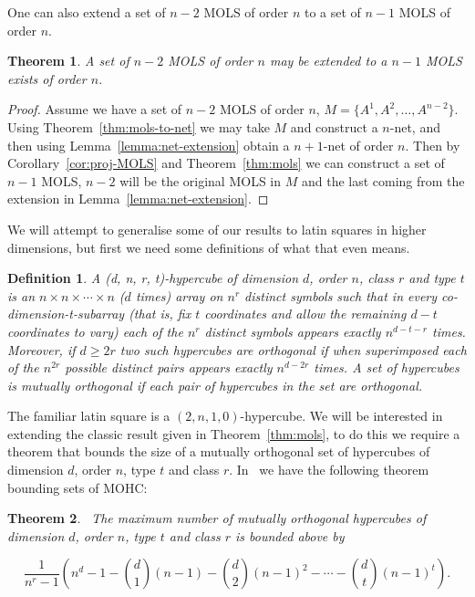 \documentclass{article}
\newtheorem{theorem}{Theorem}
\newtheorem{definition}{Definition}
\begin{document}
      One can also extend a set of \(n - 2\) MOLS of order \(n\) to a set of \(n - 1\) MOLS of order \(n\).

      \begin{theorem}
        A set of \(n - 2\) MOLS of order \(n\) may be extended to a \(n - 1\) MOLS exists of order \(n\).
      \end{theorem}

      \begin{proof}
        Assume we have a set of \(n - 2\) MOLS of order \(n\), \(M = \{A^{1}, A^{2}, \ldots, A^{n - 2}\}\). Using Theorem~\ref{thm:mols-to-net} we may take \(M\) and construct a \(n\)-net, and then using Lemma~\ref{lemma:net-extension} obtain a \(n + 1\)-net of order \(n\). Then by Corollary~\ref{cor:proj-MOLS} and Theorem~\ref{thm:mols} we can construct a set of \(n - 1\) MOLS, \(n - 2\) will be the original MOLS in \(M\) and the last coming from the extension in Lemma~\ref{lemma:net-extension}.
      \end{proof}


      We will attempt to generalise some of our results to latin squares in higher dimensions, but first we need some definitions of what that even means.
    \begin{definition}\label{def:hypercube}
        A (d, n, r, t)-hypercube of dimension \(d\), order \(n\), class \(r\) and type \(t\) is an \(n \times n \times \cdots \times n\) (\(d\) times) array on \(n^r\) distinct symbols such that in every co-dimension-t-subarray (that is, fix \(t\) coordinates and allow the remaining \(d - t\) coordinates to vary) each of the \(n^r\)
        distinct symbols appears exactly \(n^{d - t - r}\) times.
        Moreover, if \(d \geq 2r\) two such hypercubes are \textit{orthogonal} if when superimposed each of the \(n^{2r}\) possible distinct pairs appears exactly \(n^{d - 2r}\) times. A set of hypercubes is mutually orthogonal if each pair of hypercubes in the set are orthogonal.
    \end{definition}

    The familiar latin square is a \((2, n, 1, 0)\)-hypercube. We will be interested in extending the classic result given in Theorem~\ref{thm:mols}, to do this we require a 
    theorem that bounds the size of a mutually orthogonal set of hypercubes of dimension \(d\), order \(n\), type \(t\) and class \(r\). In~\cite{ethier2012sets} we have the following theorem bounding sets of MOHC:

    \begin{theorem}~\label{thm:mut-ortho}
        The maximum number of mutually orthogonal hypercubes of dimension \(d\), order \(n\), type \(t\) and class \(r\) is bounded above by

        \begin{equation}
            \frac{1}{n^r - 1}\left(n^d - 1 - \binom{d}{1}(n - 1) - \binom{d}{2}{(n - 1)}^2 - \cdots - \binom{d}{t} {(n - 1)}^t\right). \label{eq:ortho-bound}
        \end{equation}

    \end{theorem}
\end{document}
